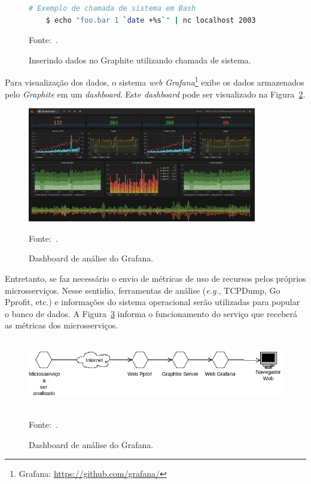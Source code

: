 \begin{figure}[htb!]
  \caption{Inserindo dados no Graphite utilizando chamada de sistema.}
  \label{fig:graphite}
  \begin{lstlisting}[language=bash]
    # Exemplo de chamada de sistema em Bash
    $ echo "foo.bar 1 `date +%s`" | nc localhost 2003
  \end{lstlisting}
  \centering

  Fonte:~\cite{graphite}.
\end{figure}

Para visualização dos dados, o sistema \textit{web Grafana}\footnote{Grafana: \url{https://github.com/grafana/}} exibe os dados armazenados pelo \textit{Graphite} em um \textit{dashboard}.
%
Este \textit{dashboard} pode ser visualizado na Figura~\ref{fig:grafana}.


\begin{figure}[htb!]
  \caption{Dashboard de análise do Grafana.}
  \label{fig:grafana}
  \includegraphics[height=5cm]{img/cap3/grafana.png}
  \centering

  Fonte:~\cite{grafana}.
\end{figure}

Entretanto, se faz necessário o envio de métricas de uso de recursos pelos próprios microsserviços.
%
Nesse sentidio, ferramentas de análise (\textit{e.g.}, TCPDump, Go Pprofit, etc.) e informações do sistema operacional serão utilizadas para popular o banco de dados.
%
A Figura~\ref{fig:estatistica} informa o funcionamento do serviço que receberá as métricas dos microsserviços.


\begin{figure}[htb!]
  \caption{Dashboard de análise do Grafana.}
  \label{fig:estatistica}
  \includegraphics[height=3cm]{img/cap3/estrutura_de_estatistica.png}
  \centering

  Fonte:~\cite{grafana}.
\end{figure}



